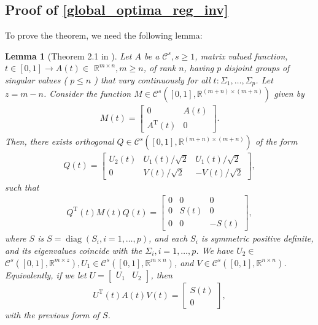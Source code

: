 \documentclass{article}
\newcommand{\T}{\mathrm{T}}
\theoremstyle{plain}
\newtheorem{lemma}[theorem]{Lemma}
\theoremstyle{definition}
\theoremstyle{remark}
\theoremstyle{remark}
\begin{document}
\subsection{Proof of \autoref{global_optima_reg_inv}} 
  To prove the theorem, we need the following lemma:
  \begin{lemma} [Theorem 2.1 in \citet{dieci2005}] \label{lemma:continuity_of_SVD}
    Let $A$ be a $\mathcal{C}^s, s \geq 1$, matrix valued function, $t \in[0,1] \rightarrow A(t) \in$ $\mathbb{R}^{m \times n}, m \geq n$, of rank $n$, having $p$ disjoint groups of singular values ( $p \leq n$ ) that vary continuously for all $t: \Sigma_1, \ldots, \Sigma_p$. Let $z=m-n$. Consider the function $M \in \mathcal{C}^s\left([0,1], \mathbb{R}^{(m+n) \times(m+n)}\right)$ given by
    \begin{align}
      M(t)=\left[\begin{array}{cc}
      0 & A(t) \\
      A^{\T}(t) & 0
      \end{array}\right] .
    \end{align}
    Then, there exists orthogonal $Q \in \mathcal{C}^s\left([0,1], \mathbb{R}^{(m+n) \times(m+n)}\right)$ of the form
    \begin{align}
      Q(t)=\left[\begin{array}{ccc}
        U_2(t) & U_1(t) / \sqrt{2} & U_1(t) / \sqrt{2} \\
        0 & V(t) / \sqrt{2} & -V(t) / \sqrt{2}
        \end{array}\right],
    \end{align}
    such that
    \begin{align}
      Q^{\T}(t) M(t) Q(t)=\left[\begin{array}{ccc}
        0 & 0 & 0 \\
        0 & S(t) & 0 \\
        0 & 0 & -S(t)
        \end{array}\right],
    \end{align}
    where $S$ is $S=\operatorname{diag}\left(S_i, i=1, \ldots, p\right)$, and each $S_i$ is symmetric positive definite, and its eigenvalues coincide with the $\Sigma_i, i=1, \ldots, p$. We have $U_2 \in$ $\mathcal{C}^s\left([0,1], \mathbb{R}^{m \times z}\right), U_1 \in \mathcal{C}^s\left([0,1], \mathbb{R}^{m \times n}\right)$, and $V \in \mathcal{C}^s\left([0,1], \mathbb{R}^{n \times n}\right)$. Equivalently, if we let $U=\left[\begin{array}{ll}U_1 & U_2\end{array}\right]$, then
    $$
    U^{\T}(t) A(t) V(t)=\left[\begin{array}{c}
    S(t) \\
    0
    \end{array}\right],
    $$
    with the previous form of $S$.
  \end{lemma}
\end{document}
